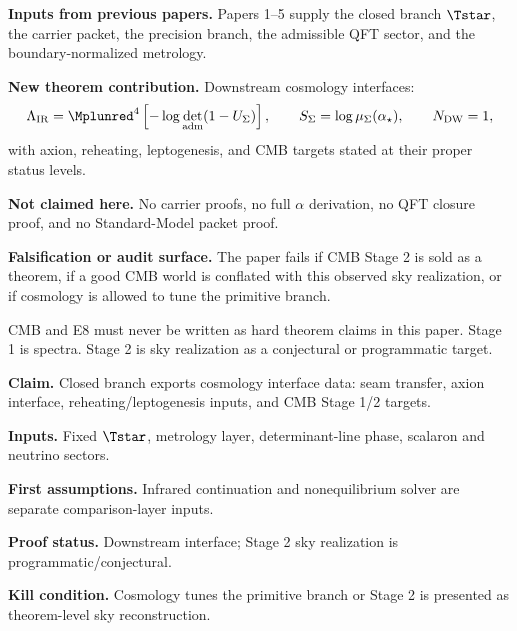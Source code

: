 
\maketitle

\begin{abstract}
This paper isolates the downstream cosmology interface of TFPT. Cosmology is not used as a
primitive selector of the theory. It is read from the closed branch through seam transfer,
determinant-line phase, scalaron sector, axion interface, reheating input, leptogenesis input,
neutrino sector, CMB spectra, and conjectural sky-map realization targets.
\end{abstract}

\begin{tfptfrontbox}
\textbf{Inputs from previous papers.} Papers 1--5 supply the closed branch $\Tstar$, the carrier
packet, the precision branch, the admissible QFT sector, and the boundary-normalized metrology.

\textbf{New theorem contribution.} Downstream cosmology interfaces:
\[
\Lambda_{\mathrm{IR}}
=
\Mplunred^4\left[-\log\det_{\mathrm{adm}}(1-U_\Sigma)\right],
\qquad
S_\Sigma=\log\mu_\Sigma(\alpha_\star),
\qquad
N_{\mathrm{DW}}=1,
\]
with axion, reheating, leptogenesis, and CMB targets stated at their proper status levels.

\textbf{Not claimed here.} No carrier proofs, no full $\alpha$ derivation, no QFT closure proof,
and no Standard-Model packet proof.

\textbf{Falsification or audit surface.} The paper fails if CMB Stage 2 is sold as a theorem, if a
good CMB world is conflated with this observed sky realization, or if cosmology is allowed to tune
the primitive branch.
\end{tfptfrontbox}

\begin{tfptwarningbox}
CMB and E8 must never be written as hard theorem claims in this paper. Stage 1 is spectra. Stage 2
is sky realization as a conjectural or programmatic target.
\end{tfptwarningbox}


\begin{tfptclaimcontract}
\textbf{Claim.} Closed branch exports cosmology interface data: seam transfer, axion interface, reheating/leptogenesis inputs, and CMB Stage 1/2 targets.\par
\textbf{Inputs.} Fixed $\Tstar$, metrology layer, determinant-line phase, scalaron and neutrino sectors.\par
\textbf{First assumptions.} Infrared continuation and nonequilibrium solver are separate comparison-layer inputs.\par
\textbf{Proof status.} Downstream interface; Stage 2 sky realization is programmatic/conjectural.\par
\textbf{Kill condition.} Cosmology tunes the primitive branch or Stage 2 is presented as theorem-level sky reconstruction.\par
\end{tfptclaimcontract}

